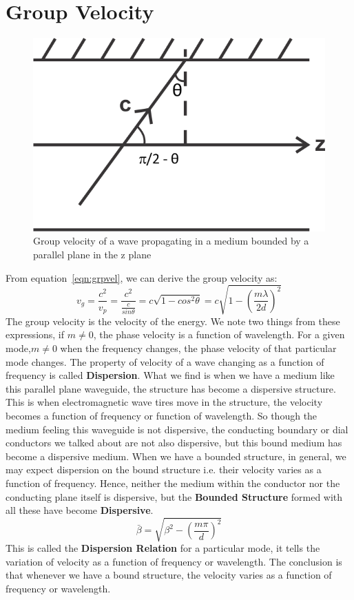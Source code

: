 \section{Group Velocity}
\begin{figure}[h]
\centering
\includegraphics[scale=1]{./graphics/silas4}
\caption{Group velocity of a wave propagating in a medium bounded by a parallel plane in the z plane}
\label{fig:silas4}
\end{figure}
From equation~\ref{eqn:grpvel}, we can derive the group velocity as:
\begin{dmath*}
v_g = \frac{c^2}{v_p} = \frac{c^2}{\frac{c}{sin\theta}}= c\sqrt{1-cos^{2}\theta} =c\sqrt{1-(\frac{m\lambda}{2d})^{2}}
\end{dmath*}
The group velocity is the velocity of the energy. We note two things from these expressions, if $m \neq 0$, the phase velocity is a function of wavelength. For a given mode,$m \neq 0$ when the frequency changes, the phase velocity of that particular mode changes. The property of velocity of a wave changing as a function of frequency is called \textbf{Dispersion}. What we find is when we have a medium like this parallel plane waveguide, the structure has become a dispersive structure. This is when electromagnetic wave tires move in the structure, the velocity becomes a function of frequency or function of wavelength. So though the medium feeling this waveguide is not dispersive, the conducting boundary or dial conductors we talked about are not also dispersive, but this bound medium has become a dispersive medium. When we have a bounded structure, in general, we may expect dispersion on the bound structure i.e. their velocity varies as a function of frequency. Hence, neither the medium within the conductor nor the conducting plane itself is dispersive, but the \textbf{Bounded Structure} formed with all these have become \textbf{Dispersive}.
\begin{equation}
\bar{\beta} = \sqrt{\beta^{2} -\left(\frac{m\pi}{d}\right)^{2}}
\end{equation} 
This is called the \textbf{Dispersion Relation} for a particular mode, it tells the variation of velocity as a function of frequency or wavelength. The conclusion is that whenever we have a bound structure, the velocity varies as a function of frequency or wavelength.

